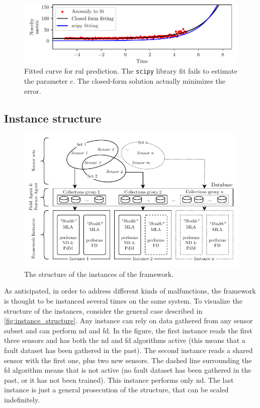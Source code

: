 \begin{figure}
    \centering
    \includegraphics[width=\textwidth]{images/Framework/EXP_3.pdf}
    \caption{Fitted curve for \gls{rul} prediction. The \texttt{scipy} library fit fails to estimate the parameter $c$. The closed-form solution actually minimizes the error.}
    \label{fig:exp_degradation_3}
\end{figure}

\subsection{Instance structure}

\begin{figure}
    \centering
    \includegraphics[scale=1]{images/Framework/FrameworkInstances.pdf}
    \caption{The structure of the instances of the framework.}
    \label{fig:instance_structure}
\end{figure}

As anticipated, in order to address different kinds of malfunctions, the framework is thought to be instanced several times on the same system. To visualize the structure of the instances, consider the general case described in \autoref{fig:instance_structure}. Any instance can rely on data gathered from any sensor subset and can perform \gls{nd} and \gls{fd}. In the figure, the first instance reads the first three sensors and has both the \gls{nd} and \gls{fd} algorithms active (this means that a fault dataset has been gathered in the past). The second instance reads a shared sensor with the first one, plus two new sensors. The dashed line surrounding the \gls{fd} algorithm means that is not active (no fault dataset has been gathered in the past, or it has not been trained). This instance performs only \gls{nd}. The last instance is just a general prosecution of the structure, that can be scaled indefinitely.
